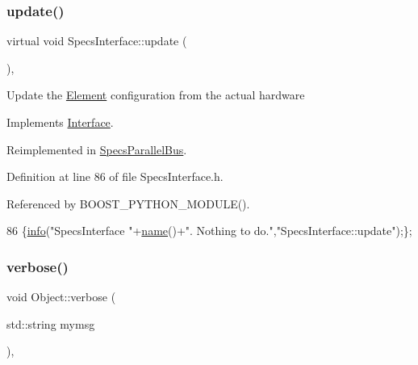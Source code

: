 \subsubsection{\texorpdfstring{update()}{update()}}
{\footnotesize\ttfamily virtual void Specs\+Interface\+::update (\begin{DoxyParamCaption}{ }\end{DoxyParamCaption})\hspace{0.3cm}{\ttfamily [inline]}, {\ttfamily [virtual]}}

Update the \hyperlink{classElement}{Element} configuration from the actual hardware 

Implements \hyperlink{classInterface_a30e71ffbe36091df9f7c0838dd4b60d2}{Interface}.



Reimplemented in \hyperlink{classSpecsParallelBus_ab07e067b62824162d7dc86bfbf4ef096}{Specs\+Parallel\+Bus}.



Definition at line 86 of file Specs\+Interface.\+h.



Referenced by B\+O\+O\+S\+T\+\_\+\+P\+Y\+T\+H\+O\+N\+\_\+\+M\+O\+D\+U\+L\+E().


\begin{DoxyCode}
86 \{\hyperlink{classObject_a644fd329ea4cb85f54fa6846484b84a8}{info}(\textcolor{stringliteral}{"SpecsInterface "}+\hyperlink{classObject_a300f4c05dd468c7bb8b3c968868443c1}{name}()+\textcolor{stringliteral}{". Nothing to do."},\textcolor{stringliteral}{"SpecsInterface::update"});\};
\end{DoxyCode}
\mbox{\label{classObject_a83d2db2df682907ea1115ad721c1c4a1}} 
\subsubsection{\texorpdfstring{verbose()}{verbose()}\hspace{0.1cm}{\footnotesize\ttfamily [1/2]}}
{\footnotesize\ttfamily void Object\+::verbose (\begin{DoxyParamCaption}\item[{std\+::string}]{mymsg }\end{DoxyParamCaption})\hspace{0.3cm}{\ttfamily [inline]}, {\ttfamily [inherited]}}



